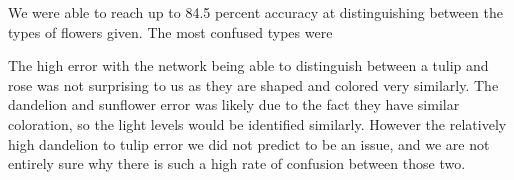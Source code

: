 \documentclass{article}
\begin{document}
We were able to reach up to 84.5 percent accuracy at distinguishing between the types of flowers given. The most confused types were 

The high error with the network being able to distinguish between a tulip and rose was not surprising to us as they are shaped and colored very similarly. The dandelion and sunflower error was likely due to the fact they have similar coloration, so the light levels would be identified similarly. However the relatively high dandelion to tulip error we did not predict to be an issue, and we are not entirely sure why there is such a high rate of confusion between those two.
\end{document}
